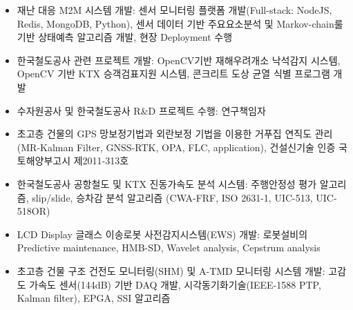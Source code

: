 \documentclass[10pt,a4paper,ragged2e]{altacv}
\begin{document}
\begin{fullwidth}
	\divider

	\begin{itemize}
		\item 재난 대응 M2M 시스템 개발: 센서 모니터링 플랫폼 개발(Full-stack: NodeJS, Redis, MongoDB, Python), 센서 데이터 기반 주요요소분석 및 Markov-chain룰 기반 상태예측 알고리즘 개발, 현장 Deployment 수행
		\item 한국철도공사 관련 프로젝트 개발: OpenCV기반 재해우려개소 낙석감지 시스템, OpenCV 기반 KTX 승객검표지원 시스템, 콘크리트 도상 균열 식별 프로그램 개발
		\item 수자원공사 및 한국철도공사 R\&D 프로젝트 수행: 연구책임자
	\end{itemize}

	\divider

	\begin{itemize}
		\item 초고층 건물의 GPS 망보정기법과 외란보정 기법을 이용한 거푸집 연직도 관리 (MR-Kalman Filter, GNSS-RTK, OPA, FLC, application), 건설신기술 인증 국토해양부고시 제2011-313호
		\item 한국철도공사 공항철도 및 KTX 진동가속도 분석 시스템: 주행안정성 평가 알고리즘, slip/slide, 승차감 분석 알고리즘 (CWA-FRF, ISO 2631-1, UIC-513, UIC-518OR)
		\item LCD Display 글래스 이송로봇 사전감지시스템(EWS) 개발: 로봇설비의 Predictive maintenance, HMB-SD, Wavelet analysis, Cepstrum analysis
		\item 초고층 건물 구조 건전도 모니터링(SHM) 및 A-TMD 모니터링 시스템 개발: 고감도 가속도 센서(144dB) 기반 DAQ 개발, 시각동기화기술(IEEE-1588 PTP, Kalman filter), EPGA, SSI 알고리즘
	\end{itemize}
\end{fullwidth}

\divider
\begin{fullwidth}



\end{fullwidth}
\end{document}
